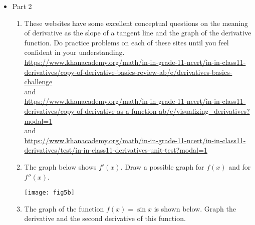 \documentclass{article}
\begin{document}
\begin{itemize}
            \item Part 2
                \begin{enumerate}
                    \item These websites have some excellent conceptual questions on the meaning of derivative as the slope of a tangent line and the graph of the derivative function. Do practice problems on each of these sites until you feel confident in your understanding.\\
                    \url{https://www.khanacademy.org/math/in-in-grade-11-ncert/in-in-class11-derivatives/copy-of-derivative-basics-review-ab/e/derivatives-basics-challenge}\\
                    and\\
                    \url{https://www.khanacademy.org/math/in-in-grade-11-ncert/in-in-class11-derivatives/copy-of-derivative-as-a-function-ab/e/visualizing_derivatives?modal=1}\\
                    and\\
                    \url{https://www.khanacademy.org/math/in-in-grade-11-ncert/in-in-class11-derivatives/test/in-in-class11-derivatives-unit-test?modal=1}
                    \item The graph below shows $f'(x)$.  Draw a possible graph for $f(x)$ and for $f''(x)$.
                   \begin{center} \texttt{[image: fig5b]}
                    \end{center}
                    
                    \item The graph of the function $f(x) = \sin{x}$ is shown below. Graph the derivative and the second derivative of this function.
\begin{center}
\end{center}


\end{enumerate}
\end{itemize}
\end{document}
